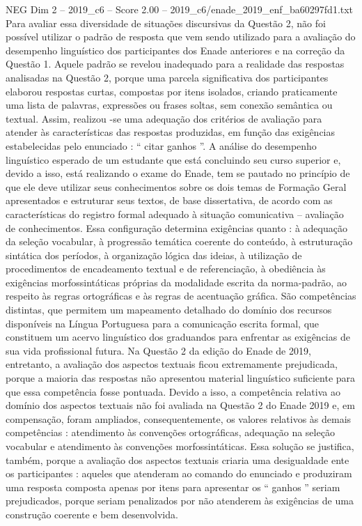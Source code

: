 \begin{textsample}{NEG Dim 2 – 2019\_c6 – Score 2.00 – 2019\_c6/enade\_2019\_enf\_ba60297fd1.txt}
Para avaliar essa diversidade de situações discursivas da Questão 2, não foi possível utilizar o padrão de resposta que vem sendo utilizado para a avaliação do desempenho linguístico dos participantes dos Enade anteriores e na correção da Questão 1.
Aquele padrão se revelou inadequado para a realidade das respostas analisadas na Questão 2, porque uma parcela significativa dos participantes elaborou respostas curtas, compostas por itens isolados, criando praticamente uma lista de palavras, expressões ou frases soltas, sem conexão semântica ou textual.
Assim, realizou -se uma adequação dos critérios de avaliação para atender às características das respostas produzidas, em função das exigências estabelecidas pelo enunciado : “ citar ganhos ”.
A análise do desempenho linguístico esperado de um estudante que está concluindo seu curso superior e, devido a isso, está realizando o exame do Enade, tem se pautado no princípio de que ele deve utilizar seus conhecimentos sobre os dois temas de Formação Geral apresentados e estruturar seus textos, de base dissertativa, de acordo com as características do registro formal adequado à situação comunicativa – avaliação de conhecimentos.
Essa configuração determina exigências quanto : à adequação da seleção vocabular, à progressão temática coerente do conteúdo, à estruturação sintática dos períodos, à organização lógica das ideias, à utilização de procedimentos de encadeamento textual e de referenciação, à obediência às exigências morfossintáticas próprias da modalidade escrita da norma-padrão, ao respeito às regras ortográficas e às regras de acentuação gráfica.
São competências distintas, que permitem um mapeamento detalhado do domínio dos recursos disponíveis na Língua Portuguesa para a comunicação escrita formal, que constituem um acervo linguístico dos graduandos para enfrentar as exigências de sua vida profissional futura.
Na Questão 2 da edição do Enade de 2019, entretanto, a avaliação dos aspectos textuais ficou extremamente prejudicada, porque a maioria das respostas não apresentou material linguístico suficiente para que essa competência fosse pontuada.
Devido a isso, a competência relativa ao domínio dos aspectos textuais não foi avaliada na Questão 2 do Enade 2019 e, em compensação, foram ampliados, consequentemente, os valores relativos às demais competências : atendimento às convenções ortográficas, adequação na seleção vocabular e atendimento às convenções morfossintáticas.
Essa solução se justifica, também, porque a avaliação dos aspectos textuais criaria uma desigualdade ente os participantes : aqueles que atenderam ao comando do enunciado e produziram uma resposta composta apenas por itens para apresentar os “ ganhos ” seriam prejudicados, porque seriam penalizados por não atenderem às exigências de uma construção coerente e bem desenvolvida.

\end{textsample}

